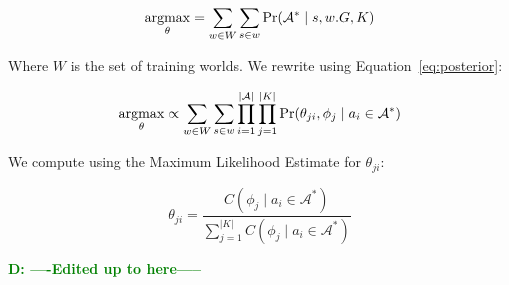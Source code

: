 \documentclass[conference]{IEEEtran}
\newcommand{\dnote}[1]{\textcolor{Green}{\textbf{D: #1}}}
\newcommand{\argmax}{\operatornamewithlimits{argmax}}
\begin{document}
\begin{equation}
\argmax_\theta = \sum_{w \in W} \sum_{s \in w} \Pr(\mathcal{A}^* \mid s, w.G, K)
\end{equation}

Where $W$ is the set of training worlds. We rewrite using Equation~\ref{eq:posterior}:

\begin{equation}
\argmax_\theta \propto \sum_{w \in W} \sum_{s \in w} \prod_{i=1}^{|\mathcal{A}|} \prod_{j=1}^{|K|} \Pr(\theta_{ji}, \phi_j \mid a_i \in \mathcal{A}^*)
\end{equation}

We compute using the Maximum Likelihood Estimate for $\theta_{ji}$:

\begin{equation}
\theta_{ji} = \frac{C(\phi_j \mid a_i \in \mathcal{A}^*)}{\sum \limits_{j=1}^{|K|} C(\phi_j \mid a_i \in \mathcal{A}^*)}
\end{equation}

\dnote{----Edited up to here-----}
\end{document}
